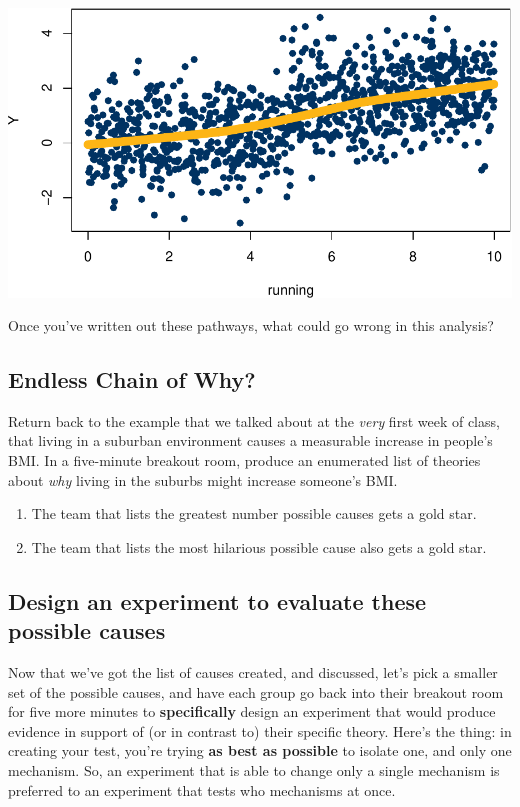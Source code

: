 \documentclass[
]{article}
\providecommand{\tightlist}{%
  \setlength{\itemsep}{0pt}\setlength{\parskip}{0pt}}
\begin{document}
\includegraphics{241-live-session_files/figure-latex/unnamed-chunk-28-1.pdf}

Once you've written out these pathways, what could go wrong in this analysis?

\hypertarget{endless-chain-of-why}{%
\subsection{Endless Chain of Why?}\label{endless-chain-of-why}}

Return back to the example that we talked about at the \emph{very} first week of class, that living in a suburban environment causes a measurable increase in people's BMI. In a five-minute breakout room, produce an enumerated list of theories about \emph{why} living in the suburbs might increase someone's BMI.

\begin{enumerate}
\def\labelenumi{\arabic{enumi}.}
\tightlist
\item
  The team that lists the greatest number possible causes gets a gold star.
\item
  The team that lists the most hilarious possible cause also gets a gold star.
\end{enumerate}

\hypertarget{design-an-experiment-to-evaluate-these-possible-causes}{%
\subsection{Design an experiment to evaluate these possible causes}\label{design-an-experiment-to-evaluate-these-possible-causes}}

Now that we've got the list of causes created, and discussed, let's pick a smaller set of the possible causes, and have each group go back into their breakout room for five more minutes to \textbf{specifically} design an experiment that would produce evidence in support of (or in contrast to) their specific theory. Here's the thing: in creating your test, you're trying \textbf{as best as possible} to isolate one, and only one mechanism. So, an experiment that is able to change only a single mechanism is preferred to an experiment that tests who mechanisms at once.
\end{document}
